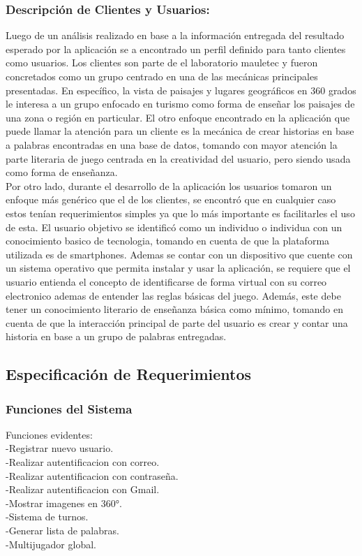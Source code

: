 \subsubsection{Descripción de Clientes y Usuarios:}
Luego de un análisis realizado en base a la información entregada del resultado esperado por la aplicación se a encontrado un perfil definido para tanto clientes como usuarios.
Los clientes son parte de el laboratorio mauletec y fueron concretados como un grupo centrado en una de las mecánicas principales presentadas. En específico, la vista de paisajes y lugares geográficos en 360 grados le interesa a un grupo enfocado en turismo como forma de enseñar los paisajes de una zona o región en particular. El otro enfoque encontrado en la aplicación que puede llamar la atención para un cliente es la mecánica de crear historias en base a palabras encontradas en una base de datos, tomando con mayor atención la parte literaria de juego centrada en la creatividad del usuario, pero siendo usada como forma de enseñanza.\\
Por otro lado, durante el desarrollo de la aplicación los usuarios tomaron un enfoque más genérico que el de los clientes, se encontró que en cualquier caso estos tenían requerimientos  simples ya que lo más importante es facilitarles el uso de esta. El usuario objetivo se identificó como un individuo o individua con un conocimiento basico de tecnologia, tomando en cuenta de que la plataforma utilizada es de smartphones. Ademas se contar con un dispositivo que cuente con un sistema operativo que permita instalar y usar la aplicación, se requiere que el usuario entienda el concepto de identificarse de forma virtual con su correo electronico ademas de entender las reglas básicas del juego. Además, este debe tener un conocimiento literario de enseñanza básica como mínimo, tomando en cuenta de que la interacción principal de parte del usuario es crear y contar una historia en base a un grupo de palabras entregadas.
\subsection{Especificación de Requerimientos}
\subsubsection{Funciones del Sistema}
Funciones evidentes:
\\	-Registrar nuevo usuario.
\\	-Realizar autentificacion con correo.
\\	-Realizar autentificacion con contraseña.
\\	-Realizar autentificacion con Gmail.
\\	-Mostrar imagenes en 360°.
\\	-Sistema de turnos.
\\	-Generar lista de palabras.
\\	-Multijugador global.


